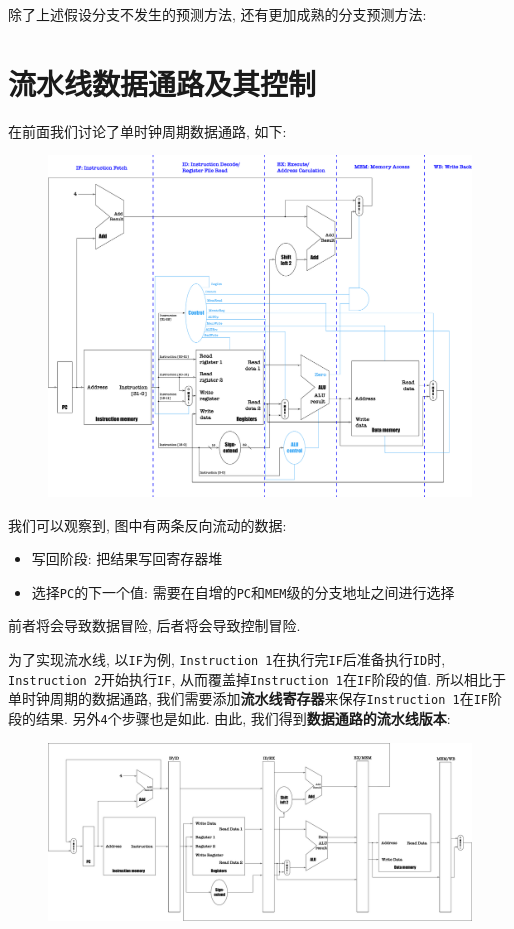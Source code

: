 \begin{enumerate}
\begin{figure}[H]
\end{figure}
除了上述假设分支不发生的预测方法, 还有更加成熟的分支预测方法:
\end{enumerate}
\section{流水线数据通路及其控制}
在前面我们讨论了单时钟周期数据通路, 如下:
\begin{figure}[H]
\centering
\includegraphics[scale=.2]{img/figure36.pdf}
\end{figure}
我们可以观察到, 图中有两条反向流动的数据:
\begin{itemize}
\item 写回阶段: 把结果写回寄存器堆
\item 选择\verb|PC|的下一个值: 需要在自增的\verb|PC|和\verb|MEM|级的分支地址之间进行选择
\end{itemize}\par
前者将会导致数据冒险, 后者将会导致控制冒险.\par \vspace{1em} 为了实现流水线, 以\verb|IF|为例, \verb|Instruction 1|在执行完\verb|IF|后准备执行\verb|ID|时, \verb|Instruction 2|开始执行\verb|IF|, 从而覆盖掉\verb|Instruction 1|在\verb|IF|阶段的值. 所以相比于单时钟周期的数据通路, 我们需要添加\textbf{流水线寄存器}来保存\verb|Instruction 1|在\verb|IF|阶段的结果. 另外\verb|4|个步骤也是如此. 由此, 我们得到\textbf{数据通路的流水线版本}:
\begin{figure}[H]
\centering
\includegraphics[scale=.2]{img/figure50.pdf}
\end{figure}
